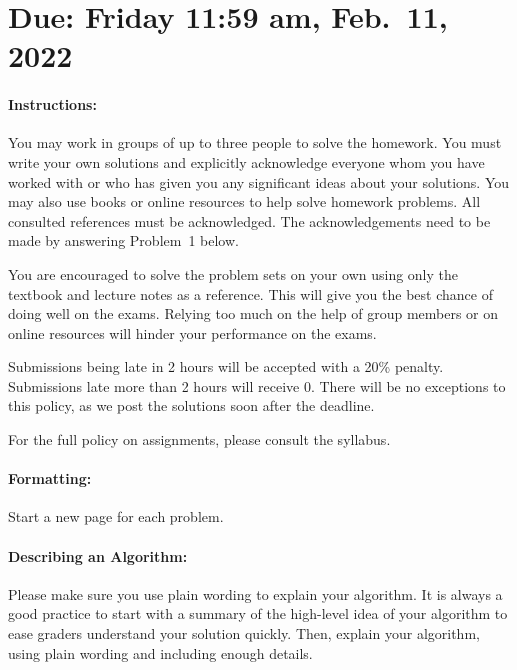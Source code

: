 \documentclass[11pt]{article}
\begin{document}
\maketitle

\section*{Due: Friday 11:59 am, Feb.\ 11, 2022}

\paragraph*{Instructions:}

You may work in groups of up to three people to solve the homework.
You must write your own solutions and explicitly acknowledge everyone whom 
you have worked with or who has given you any significant ideas about your solutions. 
You may also use books or online resources to help solve homework problems.  
All consulted references must be acknowledged. The acknowledgements need to be made by answering Problem~1 below.

You are encouraged to solve the problem sets on your own using only the textbook and lecture notes as a reference. This will give you the best chance of doing well on the exams. Relying too much on the help of group members or on online resources will hinder your performance on the exams.

Submissions being late in 2 hours will be accepted with a 20\% penalty. Submissions late more than 2 hours will receive 0. There will be no exceptions to this policy, as we post the solutions soon after the deadline. 

For the full policy on assignments, please consult the syllabus.

\paragraph*{Formatting:} Start a new page for each problem.

\paragraph*{Describing an Algorithm:} Please make sure you use plain wording to explain your algorithm. It is always a good practice to start with a summary of the high-level idea of your algorithm to ease graders understand your solution quickly. Then, explain your algorithm, using plain wording and including enough details.
\end{document}
